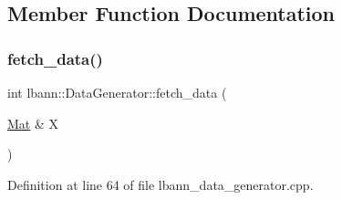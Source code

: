 \subsection{Member Function Documentation}
\mbox{\label{classlbann_1_1DataGenerator_a1465406c3e9766021dbd48b6b8c48590}} 
\subsubsection{\texorpdfstring{fetch\+\_\+data()}{fetch\_data()}}
{\footnotesize\ttfamily int lbann\+::\+Data\+Generator\+::fetch\+\_\+data (\begin{DoxyParamCaption}\item[{\hyperlink{base_8hpp_a68f11fdc31b62516cb310831bbe54d73}{Mat} \&}]{X }\end{DoxyParamCaption})}



Definition at line 64 of file lbann\+\_\+data\+\_\+generator.\+cpp.


